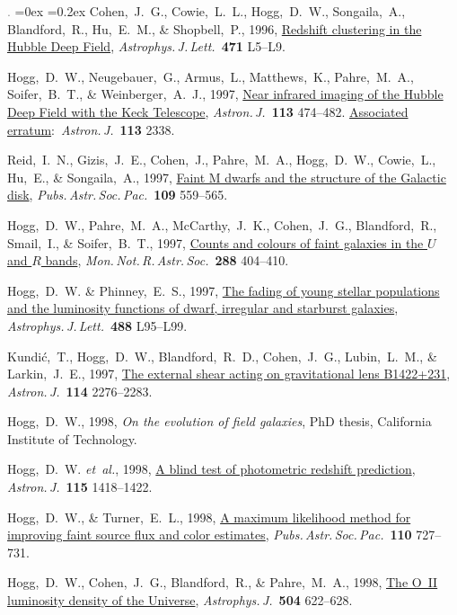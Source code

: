 \documentclass[12pt,letterpaper]{article}
\newcommand{\latin}[1]{\textsl{#1}}
\newcommand{\etal}{\latin{et~al.}}
\newcommand{\doi}[2]{\href{http://dx.doi.org/#1}{{#2}}}
\newcommand{\ads}[2]{\href{http://adsabs.harvard.edu/abs/#1}{{#2}}}
\newcommand{\deemph}[1]{\textcolor{grey}{\footnotesize{#1}}}
\newcommand{\pubnumber}[1]{\deemph{{#1}.}}
\newcounter{refpubnum}
\newcommand{\hogglist}{%
    \rightmargin=0in
    \leftmargin=0.18in
    \topsep=0ex
    \partopsep=0pt
    \itemsep=0.2ex
    \parsep=0pt
    \itemindent=-1.0\leftmargin
    \listparindent=0.0\leftmargin
    \settowidth{\labelsep}{~}
    \usecounter{refpubnum}
  }
\begin{document}
\begin{list}{\pubnumber{\therefpubnum}}{\hogglist}
Cohen,~J.~G., Cowie,~L.~L., Hogg,~D.~W., Songaila,~A., Blandford,~R.,
Hu,~E.~M., \& Shopbell,~P., 1996,
\doi{10.1086/310330}{Redshift clustering in the Hubble Deep Field},
\textit{Astrophys.\,J.\,Lett.}\ \textbf{471} L5--L9.
\item
Hogg,~D.~W., Neugebauer,~G., Armus,~L., Matthews,~K., Pahre,~M.~A., Soifer,~B.~T.,
\& Weinberger,~A.~J., 1997,
\doi{10.1086/118269}{Near infrared imaging of the Hubble Deep Field with the Keck Telescope},
\textit{Astron.\,J.}\ \textbf{113} 474--482.
\doi{10.1086/118445}{Associated erratum}:\ \textit{Astron.\,J.}\ \textbf{113} 2338.
\item
Reid,~I.~N., Gizis,~J.~E., Cohen,~J., Pahre,~M.~A., Hogg,~D.~W., Cowie,~L., Hu,~E., \& Songaila,~A., 1997,
\ads{1997PASP..109..559R}{Faint M dwarfs and the structure of the Galactic disk},
\textit{Pubs.\,Astr.\,Soc.\,Pac.}\ \textbf{109} 559--565.
\item
Hogg,~D.~W., Pahre,~M.~A., McCarthy,~J.~K., Cohen,~J.~G., Blandford,~R., Smail,~I., \& Soifer,~B.~T., 1997,
\ads{1997MNRAS.288..404H}{Counts and colours of faint galaxies in the $U$ and $R$ bands},
\textit{Mon.\,Not.\,R.\,Astr.\,Soc.}\ \textbf{288} 404--410.
\item
Hogg,~D.~W. \& Phinney,~E.~S., 1997,
\doi{10.1086/310929}{The fading of young stellar populations and the luminosity functions of dwarf, irregular and starburst galaxies},
\textit{Astrophys.\,J.\,Lett.}\ \textbf{488} L95--L99.
\item
Kundi\'c,~T., Hogg,~D.~W., Blandford,~R.~D., Cohen,~J.~G., Lubin,~L.~M., \& Larkin,~J.~E., 1997,
\doi{10.1086/118647}{The external shear acting on gravitational lens B1422+231},
\textit{Astron.\,J.}\ \textbf{114} 2276--2283.
\item
Hogg,~D.~W., 1998,
{\textit{On the evolution of field galaxies},}
PhD thesis, California Institute of Technology.
\item
Hogg,~D.~W. \etal, 1998,
\doi{10.1086/300277}{A blind test of photometric redshift prediction},
\textit{Astron.\,J.}\ \textbf{115} 1418--1422.
\item
Hogg,~D.~W., \& Turner,~E.~L., 1998,
\ads{1998PASP..110..727H}{A maximum likelihood method for improving faint source flux and color estimates},
\textit{Pubs.\,Astr.\,Soc.\,Pac.}\ \textbf{110} 727--731.
\item
Hogg,~D.~W., Cohen,~J.~G., Blandford,~R., \& Pahre,~M.~A., 1998,
\doi{10.1086/306122}{The O~II luminosity density of the Universe},
\textit{Astrophys.\,J.}\ \textbf{504} 622--628.
\item

\end{list}
\end{document}
